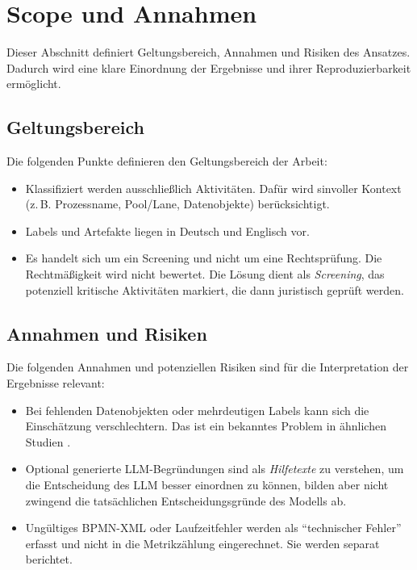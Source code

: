 \section{Scope und Annahmen}\label{sec:scope-und-annahmen}

Dieser Abschnitt definiert Geltungsbereich, Annahmen und Risiken des Ansatzes. Dadurch wird eine klare Einordnung der Ergebnisse und ihrer Reproduzierbarkeit ermöglicht.

\subsection*{Geltungsbereich}

Die folgenden Punkte definieren den Geltungsbereich der Arbeit:

\begin{itemize}
    \item Klassifiziert werden ausschließlich Aktivitäten. Dafür wird sinvoller Kontext (z.\,B. Prozessname, Pool/Lane, Datenobjekte) berücksichtigt.
    \item Labels und Artefakte liegen in Deutsch und Englisch vor.
    \item Es handelt sich um ein Screening und nicht um eine Rechtsprüfung. Die Rechtmäßigkeit wird nicht bewertet. Die Lösung dient als \emph{Screening}, das potenziell kritische Aktivitäten markiert, die dann juristisch geprüft werden.
\end{itemize}

\subsection*{Annahmen und Risiken}

Die folgenden Annahmen und potenziellen Risiken sind für die Interpretation der Ergebnisse relevant:

\begin{itemize}
    \item Bei fehlenden Datenobjekten oder mehrdeutigen Labels kann sich die Einschätzung verschlechtern. Das ist ein bekanntes Problem in ähnlichen Studien \cite{nake2023towards}.
    \item Optional generierte \ac{LLM}-Begründungen sind als \emph{Hilfetexte} zu verstehen, um die Entscheidung des \ac{LLM} besser einordnen zu können, bilden aber nicht zwingend die tatsächlichen Entscheidungsgründe des Modells ab.
    \item Ungültiges \ac{BPMN}-XML oder Laufzeitfehler werden als \enquote{technischer Fehler} erfasst und nicht in die Metrikzählung eingerechnet. Sie werden separat berichtet.
\end{itemize}
